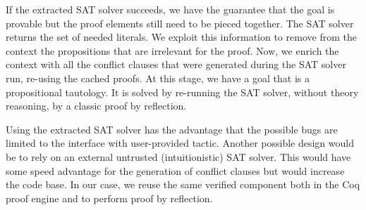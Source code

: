 \documentclass[utf8,a4paper,UKenglish,cleveref, autoref, thm-restate]{lipics-v2019}
\begin{document}
If the extracted SAT solver succeeds, we have the guarantee that the
goal is provable but the proof elements still need to be pieced together.
%
The SAT solver returns the set of needed literals.  We exploit this
information to remove from the context the propositions that are
irrelevant for the proof.
%
Now, we enrich the context with all the conflict clauses that were
generated during the SAT solver run, re-using the cached proofs.  At
this stage, we have a goal that is a propositional tautology.  It is
solved by re-running the SAT solver, without theory reasoning, by a classic
proof by reflection.

Using the extracted SAT solver has the advantage that the possible
bugs are limited to the interface with user-provided tactic.
%
Another possible design would be to rely on an external untrusted
(intuitionistic) SAT solver. This would have some speed advantage for
the generation of conflict clauses but would increase the code
base. In our case, we reuse the same verified component both in the
Coq proof engine and to perform proof by reflection.



\end{document}

